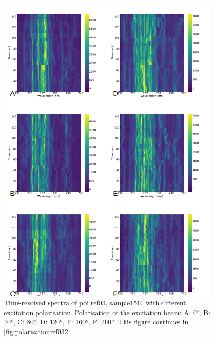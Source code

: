 \begin{figure}[h]
\centering
\includegraphics[width=1\linewidth]{Figures/pic/polarisationref03}
\caption{Time-resolved spectra of poi ref03, sample1510 with different excitation polarisation. Polarisation of the excitation beam: A: 0$^{o}$, B: 40$^{o}$, C: 80$^{o}$, D: 120$^{o}$, E: 160$^{o}$, F: 200$^{o}$. This figure continues in \ref{fig:polarisationref032} }
\label{fig:polarisationref03}
\end{figure}
